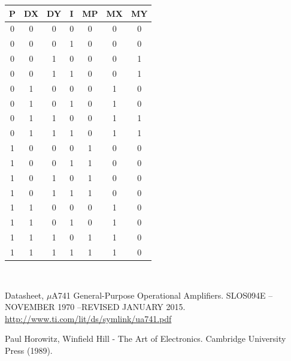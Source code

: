 \documentclass[journal, a4paper]{IEEEtran}
\begin{document}
\begin{table}[h]
\centering
\begin{tabular}{c|c|c|c|c|c|c}
\hline \textbf{P} & \textbf{DX} & \textbf{DY} & \textbf{I} & \textbf{MP} & \textbf{MX} & \textbf{MY} \\ 
\hline 
 0 & 0 & 0 & 0 & 0 & 0 & 0\\ 
 0 & 0 & 0 & 1 & 0 & 0 & 0\\ 
 0 & 0 & 1 & 0 & 0 & 0 & 1\\ 
 0 & 0 & 1 & 1 & 0 & 0 & 1\\ 
 0 & 1 & 0 & 0 & 0 & 1 & 0\\ 
 0 & 1 & 0 & 1 & 0 & 1 & 0\\ 
 0 & 1 & 1 & 0 & 0 & 1 & 1\\
 0 & 1 & 1 & 1 & 0 & 1 & 1\\
 1 & 0 & 0 & 0 & 1 & 0 & 0\\
 1 & 0 & 0 & 1 & 1 & 0 & 0\\
 1 & 0 & 1 & 0 & 1 & 0 & 0\\
 1 & 0 & 1 & 1 & 1 & 0 & 0\\
 1 & 1 & 0 & 0 & 0 & 1 & 0\\
 1 & 1 & 0 & 1 & 0 & 1 & 0\\
 1 & 1 & 1 & 0 & 1 & 1 & 0\\
 1 & 1 & 1 & 1 & 1 & 1 & 0\\
\hline 

\end{tabular} 
\end{table}
~\\


\begin{thebibliography}{5}

	Datasheet, $\mu $A741 General-Purpose Operational Amplifiers. SLOS094E – NOVEMBER 1970  –REVISED JANUARY 2015.
	\url{http://www.ti.com/lit/ds/symlink/ua741.pdf}


	Paul Horowitz, Winfield Hill - The Art of Electronics. Cambridge University Press (1989).
	
\end{thebibliography}
\end{document}
